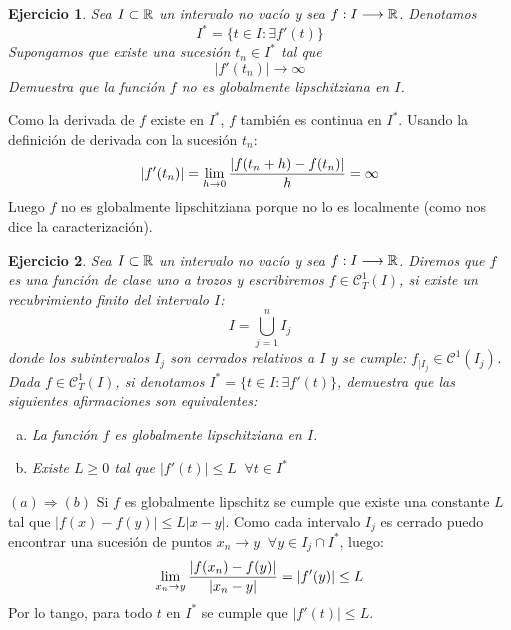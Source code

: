 \documentclass[12pt]{article}
\newtheorem{ejercicio}{Ejercicio}
\theoremstyle{definition}
\theoremstyle{remark}
\begin{document}
\begin{ejercicio}
Sea $I\subset\mathbb{R}$ un intervalo no vacío y sea $f : I \longrightarrow \mathbb{R}$. Denotamos
\[
I^*=\{t\in I:\exists f'(t)\}
\]
Supongamos que existe una sucesión $t_n\in I^*$ tal que
\[
|f'(t_n)|\longrightarrow\infty
\]
Demuestra que la función $f$ no es globalmente lipschitziana en $I$.
\end{ejercicio}
Como la derivada de $f$ existe en $I^*$, $f$ también es continua en $I^*$. Usando la definición de derivada con la sucesión $t_n$:
\[
|f'(t_n)|=\displaystyle\lim_{ h \to 0 } \frac{|f(t_n+h)-f(t_n)|}{h}=\infty
\]
Luego $f$ no es globalmente lipschitziana porque no lo es localmente (como nos dice la caracterización).
\begin{ejercicio}
Sea $I\subset\mathbb{R}$ un intervalo no vacío y sea $f : I \longrightarrow \mathbb{R}$. Diremos que $f$ es una función de clase uno a trozos y escribiremos $f\in \mathcal{C}^1_T(I)$, si existe un recubrimiento finito del intervalo $I$:
\[
I=\bigcup_{j=1}^nI_j
\]
donde los subintervalos $I_j$ son cerrados relativos a $I$ y se cumple: $f_{|I_j}\in\mathcal{C}^1(I_j)$. Dada $f\in\mathcal{C}^1_T(I)$, si denotamos $I^*=\{t\in I:\exists f'(t)\}$, demuestra que las siguientes afirmaciones son equivalentes:
\begin{enumerate}[(a)]
\item La función $f$ es globalmente lipschitziana en $I$.
\item Existe $L\geq 0$ tal que $|f'(t)|\leq L \;\; \forall t\in I^*$
\end{enumerate}
\end{ejercicio}

$(a)\Rightarrow(b)$ Si $f$ es globalmente lipschitz se cumple que existe una constante $L$ tal que $|f(x)-f(y)|\leq L|x-y|$. Como cada intervalo $I_j$ es cerrado puedo encontrar una sucesión de puntos $x_n\longrightarrow y \;\; \forall y\in I_j\cap I^*$, luego:
\[
\displaystyle\lim_{ x_n \to y } \frac{|f(x_n)-f(y)|}{|x_n-y|}=|f'(y)|\leq L
\]
Por lo tango, para todo $t$ en $I^*$ se cumple que $|f'(t)|\leq L$.
\end{document}
